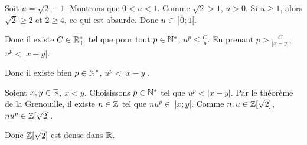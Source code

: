 \documentclass[]{../templates/homework}
\begin{document}
 Soit $u = \sqrt 2 -1$. Montrons que $0<u<1$. Comme $\sqrt 2 > 1$, $u>0$. Si $u \geq 1$, alors $\sqrt 2 \geq 2$ et $2 \geq 4$, ce qui est absurde. Donc $u\in\ ]0;1[$.

Donc il existe $C \in \mathbb R_+^*$ tel que pour tout $p\in\mathbb N^*$, $u^p \leq \frac C p$. En prenant $p > \frac C {|x-y|}$, $u^p < |x-y|$.

Donc il existe bien $p\in\mathbb N^*$, $u^p < |x-y|$.

\question Soient $x,y\in\mathbb R$, $x<y$. Choisissons $p\in\mathbb N^*$ tel que $u^p < |x-y|$. Par le théorème de la Grenouille, il existe $n\in\mathbb Z$ tel que $nu^p \in\ ]x;y[$. Comme $n,u\in\mathbb Z[\sqrt 2]$, $nu^p\in\mathbb Z[\sqrt 2]$. 

Donc $\mathbb Z[\sqrt 2]$ est dense dans $\mathbb R$.
\end{document}
